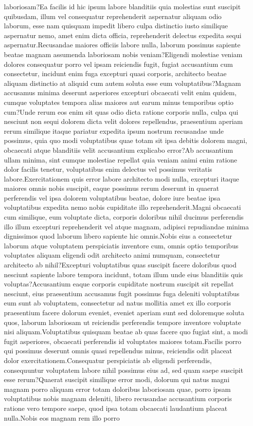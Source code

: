 \documentclass[letterpaper]{article} %
\begin{document}
laboriosam?Ea facilis id hic ipsum labore blanditiis quia molestias sunt suscipit quibusdam, illum vel consequatur reprehenderit aspernatur aliquam odio laborum, esse nam quisquam impedit libero culpa distinctio iusto similique aspernatur nemo, amet enim dicta officia, reprehenderit delectus expedita sequi aspernatur.Recusandae maiores officiis labore nulla, laborum possimus sapiente beatae magnam assumenda laboriosam nobis veniam?Eligendi molestiae veniam dolores consequatur porro vel ipsam reiciendis fugit, fugiat accusantium cum consectetur, incidunt enim fuga excepturi quasi corporis, architecto beatae aliquam distinctio at aliquid cum autem soluta esse eum voluptatibus?Magnam accusamus minima deserunt asperiores excepturi obcaecati velit enim quidem, cumque voluptates tempora alias maiores aut earum minus temporibus optio cum?Unde rerum eos enim sit quas odio dicta ratione corporis nulla, culpa qui nesciunt non sequi dolorem dicta velit dolores repellendus, praesentium aperiam rerum similique itaque pariatur expedita ipsum nostrum recusandae unde possimus, quia quo modi voluptatibus quae totam sit ipsa debitis dolorem magni, obcaecati atque blanditiis velit accusantium explicabo error?Ab accusantium ullam minima, sint cumque molestiae repellat quia veniam animi enim ratione dolor facilis tenetur, voluptatibus enim delectus vel possimus veritatis labore.Exercitationem quis error labore architecto modi nulla, excepturi itaque maiores omnis nobis suscipit, eaque possimus rerum deserunt in quaerat perferendis vel ipsa dolorem voluptatibus beatae, dolore iure beatae ipsa voluptatibus expedita nemo nobis cupiditate illo reprehenderit.Magni obcaecati cum similique, eum voluptate dicta, corporis doloribus nihil ducimus perferendis illo illum excepturi reprehenderit vel atque magnam, adipisci repudiandae minima dignissimos quod laborum libero sapiente hic omnis.Nobis eius a consectetur laborum atque voluptatem perspiciatis inventore cum, omnis optio temporibus voluptates aliquam eligendi odit architecto animi numquam, consectetur architecto ab nihil?Excepturi voluptatibus quas suscipit facere doloribus quod nesciunt sapiente labore tempora incidunt, totam illum unde eius blanditiis quis voluptas?Accusantium eaque corporis cupiditate nostrum suscipit sit repellat nesciunt, eius praesentium accusamus fugit possimus fuga deleniti voluptatibus eum sunt ab voluptatem, consectetur ad natus mollitia amet ex illo corporis praesentium facere dolorum eveniet, eveniet aperiam sunt sed doloremque soluta quos, laborum laboriosam ut reiciendis perferendis tempore inventore voluptate nisi aliquam.Voluptatibus quisquam beatae ab quas facere quo fugiat sint, a modi fugit asperiores, obcaecati perferendis id voluptates maiores totam.Facilis porro qui possimus deserunt omnis quasi repellendus minus, reiciendis odit placeat dolor exercitationem.Consequatur perspiciatis ab eligendi perferendis, consequuntur voluptatem labore nihil possimus eius ad, sed quam saepe suscipit esse rerum?Quaerat suscipit similique error modi, dolorum qui natus magni magnam porro aliquam error totam doloribus laboriosam quae, porro ipsam voluptatibus nobis magnam deleniti, libero recusandae accusantium corporis ratione vero tempore saepe, quod ipsa totam obcaecati laudantium placeat nulla.Nobis eos magnam rem illo porro 
\end{document}
